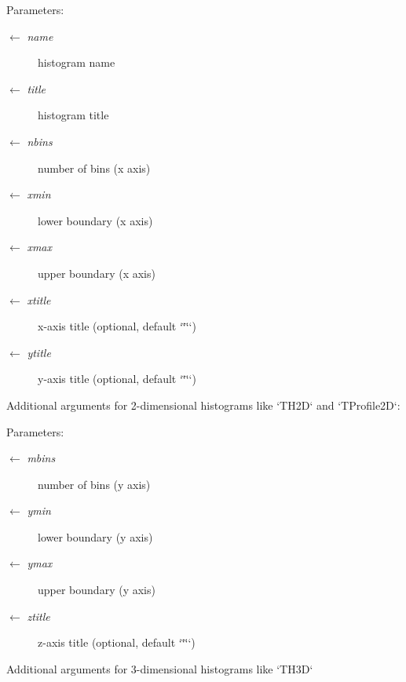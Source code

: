 \begin{Desc}
\item[Parameters:]
\begin{description}
\item[\mbox{$\leftarrow$} {\em name}]histogram name \item[\mbox{$\leftarrow$} {\em title}]histogram title \item[\mbox{$\leftarrow$} {\em nbins}]number of bins (x axis) \item[\mbox{$\leftarrow$} {\em xmin}]lower boundary (x axis) \item[\mbox{$\leftarrow$} {\em xmax}]upper boundary (x axis) \item[\mbox{$\leftarrow$} {\em xtitle}]x-axis title (optional, default `\char`\"{}\char`\"{}`) \item[\mbox{$\leftarrow$} {\em ytitle}]y-axis title (optional, default `\char`\"{}\char`\"{}`)\end{description}
\end{Desc}
Additional arguments for 2-dimensional histograms like `TH2D` and `TProfile2D`:

\begin{Desc}
\item[Parameters:]
\begin{description}
\item[\mbox{$\leftarrow$} {\em mbins}]number of bins (y axis) \item[\mbox{$\leftarrow$} {\em ymin}]lower boundary (y axis) \item[\mbox{$\leftarrow$} {\em ymax}]upper boundary (y axis) \item[\mbox{$\leftarrow$} {\em ztitle}]z-axis title (optional, default `\char`\"{}\char`\"{}`)\end{description}
\end{Desc}
Additional arguments for 3-dimensional histograms like `TH3D`

